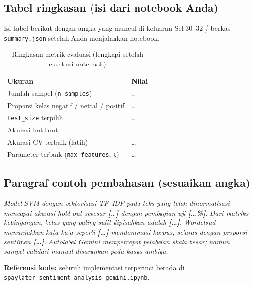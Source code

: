 \documentclass[11pt,a4paper]{article}
\begin{document}
\subsection{Tabel ringkasan (isi dari notebook Anda)}

\noindent
Isi tabel berikut dengan angka yang muncul di keluaran Sel 30--32 / berkas \texttt{summary.json} setelah Anda menjalankan notebook.

\begin{table}[htbp]
  \centering
  \caption{Ringkasan metrik evaluasi (lengkapi setelah eksekusi notebook)}
  \begin{tabular}{@{}ll@{}}
    \toprule
    \textbf{Ukuran} & \textbf{Nilai} \\
    \midrule
    Jumlah sampel (\texttt{n\_samples}) & \ldots \\
    Proporsi kelas negatif / netral / positif & \ldots \\
    \texttt{test\_size} terpilih & \ldots \\
    Akurasi hold-out & \ldots \\
    Akurasi CV terbaik (latih) & \ldots \\
    Parameter terbaik (\texttt{max\_features}, \texttt{C}) & \ldots \\
    \bottomrule
  \end{tabular}
\end{table}

\subsection{Paragraf contoh pembahasan (sesuaikan angka)}

\textit{Model SVM dengan vektorisasi TF--IDF pada teks yang telah dinormalisasi mencapai akurasi hold-out sebesar \textbf{[\ldots]} dengan pembagian uji \textbf{[\ldots\%]}. Dari matriks kebingungan, kelas yang paling sulit dipisahkan adalah \textbf{[\ldots]}. Wordcloud menunjukkan kata-kata seperti \textbf{[\ldots]} mendominasi korpus, selaras dengan proporsi sentimen \textbf{[\ldots]}. Autolabel Gemini mempercepat pelabelan skala besar; namun sampel validasi manual disarankan pada kasus ambigu.}

\vspace{1em}
\noindent
\textbf{Referensi kode:} seluruh implementasi terperinci berada di \texttt{spaylater\_sentiment\_analysis\_gemini.ipynb}.
\end{document}
